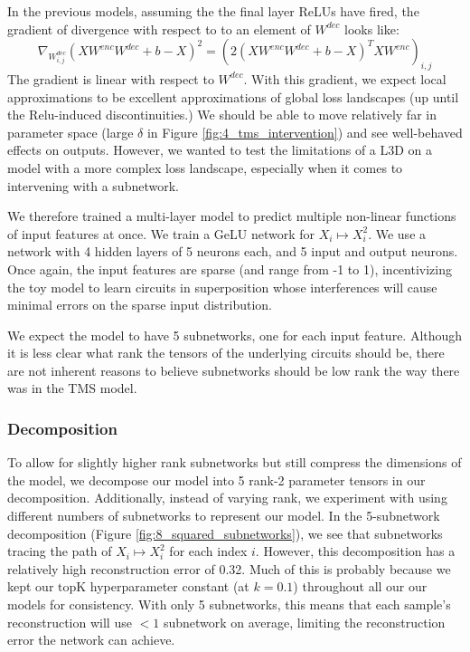 \documentclass{article}
\theoremstyle{plain}
\theoremstyle{definition}
\theoremstyle{remark}
\begin{document}
In the previous models, assuming the the final layer ReLUs have fired, the gradient of divergence with respect to  to an element of $W^{dec}$ looks like:
\begin{equation}
  \nabla_{W^{dec}_{i,j}} ( X W^{enc}W^{dec} + b - X)^2 = (2 (X W^{enc} W^{dec} + b- X)^T X W^{enc})_{i,j}
\end{equation}
The gradient is linear with respect to $W^{dec}$. With this gradient, we expect local approximations to be excellent approximations of global loss landscapes (up until the Relu-induced discontinuities.) We should be able to move relatively far in parameter space (large $\delta$ in Figure \ref{fig:4_tms_intervention}) and see well-behaved effects on outputs. However, we wanted to test the limitations of a L3D on a model with a more complex loss landscape, especially when it comes to intervening with a subnetwork.

We therefore trained a multi-layer model to predict multiple non-linear functions of input features at once. We train a GeLU network for $X_i \mapsto X_i^2$. We use a network with 4 hidden layers of 5 neurons each, and 5 input and output neurons. Once again, the input features are sparse (and range from -1 to 1), incentivizing the toy model to learn circuits in superposition whose interferences will cause minimal errors on the sparse input distribution. 

We expect the model to have 5 subnetworks, one for each input feature. Although it is less clear what rank the tensors of the underlying circuits should be, there are not inherent reasons to believe subnetworks should be low rank the way there was in the TMS model. 

\subsubsection{Decomposition}

To allow for slightly higher rank subnetworks but still compress the dimensions of the model, we decompose our model into 5 rank-2 parameter tensors in our decomposition. Additionally, instead of varying rank, we experiment with using different numbers of subnetworks to represent our model. In the 5-subnetwork decomposition (Figure \ref{fig:8_squared_subnetworks}), we see that subnetworks tracing the path of $X_i \mapsto X_i^2$ for each index $i$. However, this decomposition has a relatively high reconstruction error of 0.32. Much of this is probably because we kept our $\text{topK}$ hyperparameter constant (at $k=0.1$) throughout all our our models for consistency.  With only 5 subnetworks, this means that each sample's reconstruction will use $<1$ subnetwork on average,  limiting the reconstruction error the network can achieve. 
\end{document}
